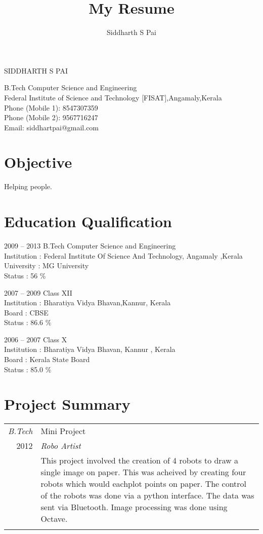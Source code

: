 \documentclass[a4paper]{article}
\title{My Resume}
\author{Siddharth S Pai}
\begin{document}
\pagestyle{empty}
\begin{center}

\Large
\textsc{SIDDHARTH S PAI}
\end{center}
\vspace{1.2\baselineskip}
\begin{flushleft}
B.Tech Computer Science and Engineering\\Federal Institute of Science and Technology [FISAT],Angamaly,Kerala\\
Phone (Mobile 1): 8547307359\\
Phone (Mobile 2): 9567716247\\
Email: siddhartpai@gmail.com \\
\end{flushleft}

\section{Objective}
\begin{flushleft}
Helping people.
\end{flushleft}


\section{Education Qualification}
\begin{CV}
\item[2009 -- 2013] B.Tech Computer Science and Engineering \\
Institution : Federal Institute Of Science And Technology, Angamaly ,Kerala \\
University : MG University \\
Status : 56 \% 
\item[2007 -- 2009] Class XII\\
Institution : Bharatiya Vidya Bhavan,Kannur, Kerala\\
Board : CBSE\\
Status : 86.6 \%
\item[2006 -- 2007] Class X\\
Institution : Bharatiya Vidya Bhavan, Kannur , Kerala\\ 
Board : Kerala State Board\\
Status : 85.0 \%
\end{CV}


\section{Project Summary}
\begin{tabular}{r|p{15cm}}
\emph{B.Tech} & Mini Project \\
\textsc{2012} & \emph{Robo Artist} \\
& \normalsize{This project involved the creation of 4 robots to draw a single image on paper. This was acheived by creating four robots which would eachplot points on paper. The control of the robots was done via a python interface. The data was sent via Bluetooth. Image processing was done using Octave. 
}
\\
\multicolumn{2}{c}{}
\end{tabular}
\end{document}

